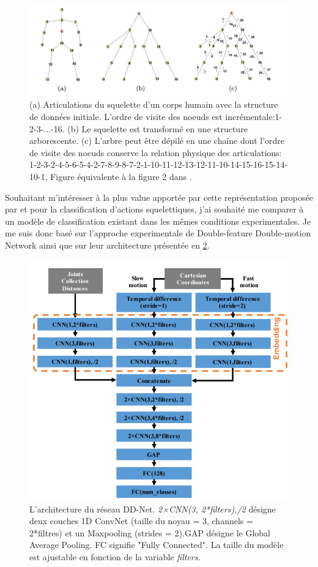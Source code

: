 \begin{figure}[H]
    \centering
    \includegraphics[width=1\linewidth]{Images/DFS.png}
    \caption{(a) Articulations du squelette d'un corps humain avec la structure de données initiale. L'ordre de visite des noeuds est incrémentale:1-2-3-...-16. (b) Le squelette est transformé en une structure arborescente. (c)  L'arbre peut être dépilé en une chaîne dont l'ordre de visite des noeuds conserve la relation physique des articulations: 1-2-3-2-4-5-6-5-4-2-7-8-9-8-7-2-1-10-11-12-13-12-11-10-14-15-16-15-14-10-1, Figure équivalente à la figure 2 dans  \cite{liu2016spatio}.}
    \label{fig:DFS}
\end{figure}

Souhaitant m'intéresser à la plus value apportée par cette représentation proposée par \cite{liu2016spatio} et \cite{2018arXiv180110304Y} pour la classification d'actions squelettiques, j'ai souhaité me comparer à un modèle de classification existant dans les mêmes conditions experimentales. Je me suis donc basé sur l'approche experimentale de Double-feature Double-motion Network \cite{2019arXiv190709658Y} ainsi que sur leur architecture présentée en \ref{fig:DDnet}.


\begin{figure}[H]
    \centering
    \includegraphics[width=0.55\linewidth]{Images/ddnet.png}
    \caption{L'architecture du réseau DD-Net. \textit{2×CNN(3,
2*filters),/2} désigne deux couches 1D ConvNet (taille du noyau
= 3, channels = 2*filtres) et un Maxpooling (strides = 2).GAP
désigne le Global Average Pooling. FC signifie "Fully Connected". La taille du modèle est ajustable en fonction de la variable \textit{filters}.}
    \label{fig:DDnet}
\end{figure}

